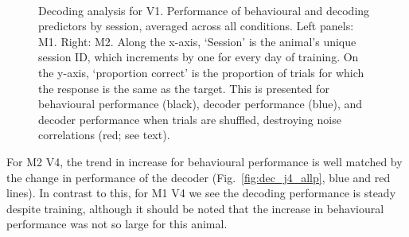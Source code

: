 \begin{figure}[htbp]
    ~~
    \caption{%
    Decoding analysis for \ac{V1}.
    Performance of behavioural and decoding predictors by session, averaged across all conditions.
    Left panels: \ac{M1}. Right: \ac{M2}.
	Along the x-axis, `Session' is the animal's unique session ID, which increments by one for every day of training.
    On the y-axis, `proportion correct' is the proportion of trials for which the response is the same as the target.
    This is presented for behavioural performance (black), decoder performance (blue), and decoder performance when trials are shuffled, destroying noise correlations (red; see text).
}
    \label{fig:dec_all_v1}
\end{figure}



For \ac{M2} \ac{V4}, the trend in increase for behavioural performance is well matched by the change in performance of the decoder (Fig.~\ref{fig:dec_j4_allp}, blue and red lines).
In contrast to this, for \ac{M1} \ac{V4} we see the decoding performance is steady despite training, although it should be noted that the increase in behavioural performance was not so large for this animal.

